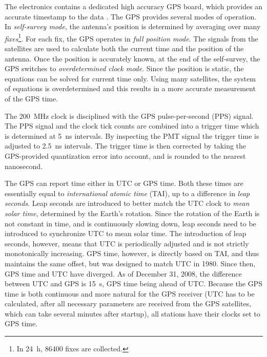 The \hisparc electronics contains a dedicated high accuracy GPS board, which
provides an accurate timestamp to the data \cite{trimble}.  The GPS provides
several modes of operation. In \emph{self-survey mode}, the antenna's position
is determined by averaging over many \emph{fixes}\footnote{In \SI{24}{\hour},
\num{86400} fixes are collected.}. For each fix, the GPS operates in \emph{full
position mode}. The signals from the satellites are used to calculate both
the current time and the position of the antenna. Once the position is
accurately known, at the end of the self-survey, the GPS switches to
\emph{overdetermined clock mode}. Since the position is static, the
equations can be solved for current time only. Using many satellites, the
system of equations is overdetermined and this results in a more accurate
measurement of the GPS time.

The \hisparc \SI{200}{\mega\hertz} clock is disciplined with the GPS
pulse-per-second (PPS) signal.  The PPS signal and the clock tick counts
are combined into a trigger time which is determined at
\SI{5}{\nano\second} intervals.  By inspecting the PMT signal the trigger time
is adjusted to \SI{2.5}{\nano\second} intervals.  The trigger time is then
corrected by taking the GPS-provided quantization error into account, and
is rounded to the nearest nanosecond.

The GPS can report time either in UTC or GPS time.
Both these times are essentially equal to \emph{international atomic time}
(TAI), up to a difference in \emph{leap seconds}.  Leap seconds are introduced
to better match the UTC clock to \emph{mean solar time}, determined by the
Earth's rotation.  Since the rotation of the Earth is not constant in time, and
is continuously slowing down, leap seconds need to be introduced to synchronize
UTC to mean solar time.  The introduction of leap seconds, however, means that
UTC is periodically adjusted and is not strictly monotonically increasing.  GPS
time, however, is directly based on TAI, and thus maintains the same offset, but
was designed to match UTC in 1980. Since then, GPS time and UTC have diverged.
As of December 31, 2008, the difference between UTC and GPS is \SI{15}{\second},
GPS time being ahead of UTC.  Because the GPS time is both continuous and more
natural for the GPS receiver (UTC has to be calculated, after all necessary
parameters are received from the GPS satellites, which can take several minutes
after startup), all \hisparc stations have their clocks set to GPS
time.

